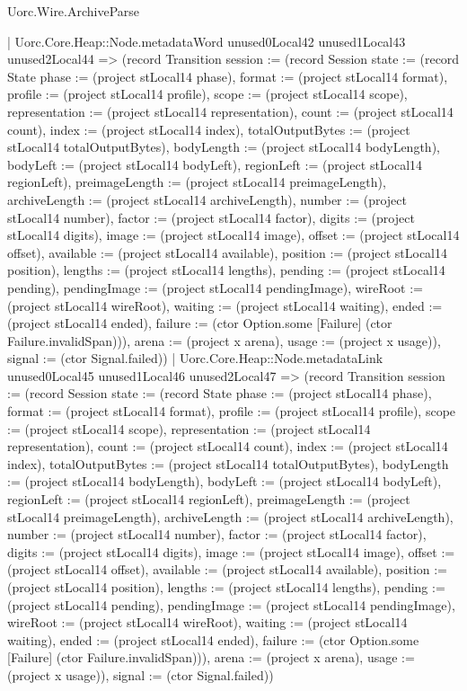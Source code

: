 \begin{lexlean}{Uorc.Wire.ArchiveParse}
\begin{semanticmodule}
{            | Uorc.Core.Heap::Node.metadataWord unused0Local42 unused1Local43 unused2Local44 => (record Transition {session := (record Session {state := (record State {phase := (project stLocal14 phase), format := (project stLocal14 format), profile := (project stLocal14 profile), scope := (project stLocal14 scope), representation := (project stLocal14 representation), count := (project stLocal14 count), index := (project stLocal14 index), totalOutputBytes := (project stLocal14 totalOutputBytes), bodyLength := (project stLocal14 bodyLength), bodyLeft := (project stLocal14 bodyLeft), regionLeft := (project stLocal14 regionLeft), preimageLength := (project stLocal14 preimageLength), archiveLength := (project stLocal14 archiveLength), number := (project stLocal14 number), factor := (project stLocal14 factor), digits := (project stLocal14 digits), image := (project stLocal14 image), offset := (project stLocal14 offset), available := (project stLocal14 available), position := (project stLocal14 position), lengths := (project stLocal14 lengths), pending := (project stLocal14 pending), pendingImage := (project stLocal14 pendingImage), wireRoot := (project stLocal14 wireRoot), waiting := (project stLocal14 waiting), ended := (project stLocal14 ended), failure := (ctor Option.some [Failure] (ctor Failure.invalidSpan))}), arena := (project x arena), usage := (project x usage)}), signal := (ctor Signal.failed)})
            | Uorc.Core.Heap::Node.metadataLink unused0Local45 unused1Local46 unused2Local47 => (record Transition {session := (record Session {state := (record State {phase := (project stLocal14 phase), format := (project stLocal14 format), profile := (project stLocal14 profile), scope := (project stLocal14 scope), representation := (project stLocal14 representation), count := (project stLocal14 count), index := (project stLocal14 index), totalOutputBytes := (project stLocal14 totalOutputBytes), bodyLength := (project stLocal14 bodyLength), bodyLeft := (project stLocal14 bodyLeft), regionLeft := (project stLocal14 regionLeft), preimageLength := (project stLocal14 preimageLength), archiveLength := (project stLocal14 archiveLength), number := (project stLocal14 number), factor := (project stLocal14 factor), digits := (project stLocal14 digits), image := (project stLocal14 image), offset := (project stLocal14 offset), available := (project stLocal14 available), position := (project stLocal14 position), lengths := (project stLocal14 lengths), pending := (project stLocal14 pending), pendingImage := (project stLocal14 pendingImage), wireRoot := (project stLocal14 wireRoot), waiting := (project stLocal14 waiting), ended := (project stLocal14 ended), failure := (ctor Option.some [Failure] (ctor Failure.invalidSpan))}), arena := (project x arena), usage := (project x usage)}), signal := (ctor Signal.failed)})
}
\end{semanticmodule}
\end{lexlean}

